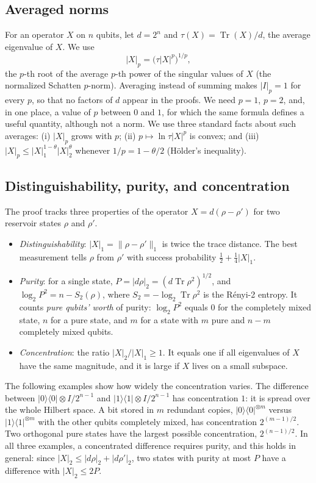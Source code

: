 \documentclass[aps,prl,twocolumn,superscriptaddress,floatfix]{revtex4-2}
\theoremstyle{plain}
\newcommand{\tr}{\operatorname{Tr}}
\newcommand{\ketbra}[2]{|#1\rangle\!\langle #2|}
\newcommand{\nrm}[2]{\lvert #1\rvert_{#2}}
\newcommand{\Norm}[1]{\lVert #1\rVert}
\begin{document}
\subsection{Averaged norms}

For an operator $X$ on $n$ qubits, let $d=2^n$ and $\tau(X)=\tr(X)/d$, the average eigenvalue of $X$. We use
\begin{equation}
\nrm Xp=\bigl(\tau|X|^p\bigr)^{1/p},
\label{eq:S-norm}
\end{equation}
the $p$-th root of the average $p$-th power of the singular values of $X$ (the normalized Schatten $p$-norm). Averaging instead of summing makes $\nrm Ip=1$ for every $p$, so that no factors of $d$ appear in the proofs. We need $p=1$, $p=2$, and, in one place, a value of $p$ between $0$ and $1$, for which the same formula defines a useful quantity, although not a norm. We use three standard facts about such averages: (i) $\nrm Xp$ grows with $p$; (ii) $p\mapsto\ln\tau|X|^p$ is convex; and (iii) $\nrm Xp\le\nrm X1^{1-\theta}\nrm X2^{\theta}$ whenever $1/p=1-\theta/2$ (H\"older's inequality).

\subsection{Distinguishability, purity, and concentration}

The proof tracks three properties of the operator $X=d(\rho-\rho')$ for two reservoir states $\rho$ and $\rho'$.
\begin{itemize}
\item \emph{Distinguishability}: $\nrm X1=\Norm{\rho-\rho'}_1$ is twice the trace distance. The best measurement tells $\rho$ from $\rho'$ with success probability $\frac12+\frac14\nrm X1$.
\item \emph{Purity}: for a single state, $P=\nrm{d\rho}2=(d\tr\rho^2)^{1/2}$, and $\log_2P^2=n-S_2(\rho)$, where $S_2=-\log_2\tr\rho^2$ is the R\'enyi-2 entropy. It counts \emph{pure qubits' worth} of purity: $\log_2P^2$ equals $0$ for the completely mixed state, $n$ for a pure state, and $m$ for a state with $m$ pure and $n-m$ completely mixed qubits.
\item \emph{Concentration}: the ratio $\nrm X2/\nrm X1\ge1$. It equals one if all eigenvalues of $X$ have the same magnitude, and it is large if $X$ lives on a small subspace.
\end{itemize}
The following examples show how widely the concentration varies. The difference between $\ketbra00\otimes I/2^{n-1}$ and $\ketbra11\otimes I/2^{n-1}$ has concentration $1$: it is spread over the whole Hilbert space. A bit stored in $m$ redundant copies, $\ketbra00^{\otimes m}$ versus $\ketbra11^{\otimes m}$ with the other qubits completely mixed, has concentration $2^{(m-1)/2}$. Two orthogonal pure states have the largest possible concentration, $2^{(n-1)/2}$. In all three examples, a concentrated difference requires purity, and this holds in general: since $\nrm X2\le\nrm{d\rho}2+\nrm{d\rho'}2$, two states with purity at most $P$ have a difference with $\nrm X2\le2P$.
\end{document}
